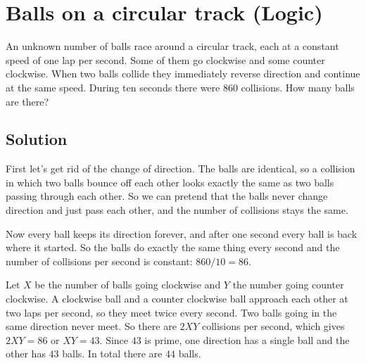 \section {Balls on a circular track (Logic)}

An unknown number of balls race around a circular track, each at a constant speed of one lap per second.
Some of them go clockwise and some counter clockwise.
When two balls collide they immediately reverse direction and continue at the same speed.
During ten seconds there were 860 collisions.
How many balls are there?

\subsection{Solution}

First let's get rid of the change of direction. The balls are identical, so a collision in which two balls bounce
off each other looks exactly the same as two balls passing through each other.
So we can pretend that the balls never change direction and just pass each other, and the number of collisions stays the same.

Now every ball keeps its direction forever, and after one second every ball is back where it started.
So the balls do exactly the same thing every second and the number of collisions per second is constant: $860/10 = 86$.

Let $X$ be the number of balls going clockwise and $Y$ the number going counter clockwise.
A clockwise ball and a counter clockwise ball approach each other at two laps per second, so they meet twice every second.
Two balls going in the same direction never meet.
So there are $2XY$ collisions per second, which gives $2XY = 86$ or $XY = 43$.
Since $43$ is prime, one direction has a single ball and the other has $43$ balls.
In total there are $44$ balls.
